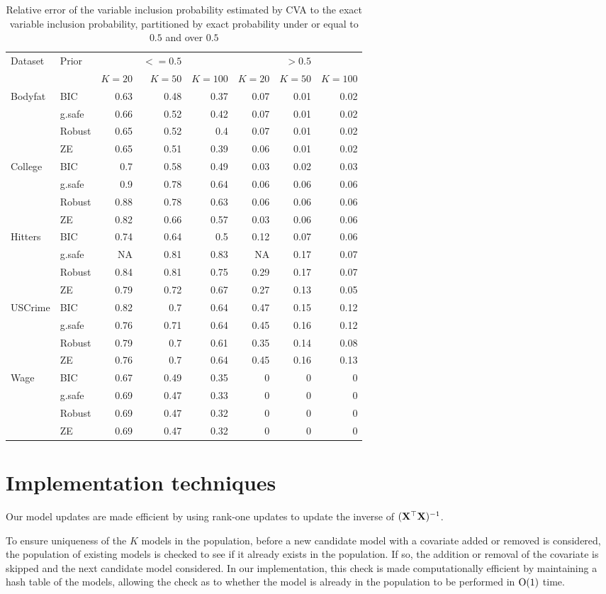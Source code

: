 \documentclass{amsart}[12pt]
\begin{document}
\begin{table}\label{tab:variable_inclusion_rel_error}
\caption{Relative error of the variable inclusion probability estimated by CVA to the
					exact variable inclusion probability, partitioned by exact probability under or equal to $0.5$ and
					over $0.5$}
\begin{tabular}{|ll|rrr|rrr|}
	\hline
	Dataset & Prior & & $<=0.5$ & & & $>0.5$ &\\
	& & $K = 20$ & $K = 50$ & $K = 100$ & $K = 20$ & $K = 50$ & $K = 100$ \\
	\hline
	Bodyfat&BIC&0.63&0.48&0.37&0.07&0.01&0.02\\
	&g.safe&0.66&0.52&0.42&0.07&0.01&0.02\\
	&Robust&0.65&0.52&0.4&0.07&0.01&0.02\\
	&ZE&0.65&0.51&0.39&0.06&0.01&0.02\\
	College&BIC&0.7&0.58&0.49&0.03&0.02&0.03\\
	&g.safe&0.9&0.78&0.64&0.06&0.06&0.06\\
	&Robust&0.88&0.78&0.63&0.06&0.06&0.06\\
	&ZE&0.82&0.66&0.57&0.03&0.06&0.06\\
	Hitters&BIC&0.74&0.64&0.5&0.12&0.07&0.06\\
	&g.safe&NA&0.81&0.83&NA&0.17&0.07\\
	&Robust&0.84&0.81&0.75&0.29&0.17&0.07\\
	&ZE&0.79&0.72&0.67&0.27&0.13&0.05\\
	USCrime&BIC&0.82&0.7&0.64&0.47&0.15&0.12\\
	&g.safe&0.76&0.71&0.64&0.45&0.16&0.12\\
	&Robust&0.79&0.7&0.61&0.35&0.14&0.08\\
	&ZE&0.76&0.7&0.64&0.45&0.16&0.13\\
	Wage&BIC&0.67&0.49&0.35&0&0&0\\
	&g.safe&0.69&0.47&0.33&0&0&0\\
	&Robust&0.69&0.47&0.32&0&0&0\\
	&ZE&0.69&0.47&0.32&0&0&0\\
	\hline
\end{tabular}
\end{table}

\section{Implementation techniques}
Our model updates are made efficient by using rank-one updates to update the inverse of $({\bf X}^\top {\bf X})^{-1}$.

To ensure uniqueness of the $K$ models in the population, before a new candidate model with a covariate added
or removed is considered, the population of existing models is checked to see if it already exists in the
population. If so, the addition or removal of the covariate is skipped and the next candidate model considered.
In our implementation, this check is made computationally efficient by maintaining a hash table of the models,
allowing the check as to whether the model is already in the population to be performed in $\text{O}(1)$ time.



\end{document}

